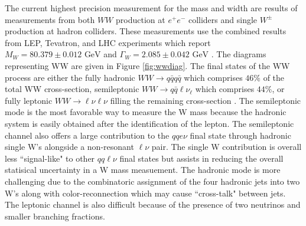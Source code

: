 


 The current highest precision measurement for the mass and width are results of measurements from both $WW$ production at $e^+ e^-$ colliders and single $W^\pm$ production at hadron colliders. These measurements use the combined results from LEP, Tevatron, and LHC experiments which report $M_W = 80.379 \pm 0.012 \, \, \text{GeV} $ and $\Gamma_W = 2.085 \pm 0.042 \,  \,\text{GeV}$ \cite{pdg}. The diagrams representing WW are given in Figure \ref{fig:wwdiag}. The final states of the WW process are either the fully hadronic $WW\rightarrow q\bar{q}q\bar{q}$ which comprises $46\%$ of the total WW cross-section, semileptonic $WW\rightarrow q\bar{q}\ell\nu_{\ell}$ which comprises $44\%$, or fully leptonic $WW\rightarrow \ell \nu \ell \nu$ filling the remaining cross-section \cite{wwOPAL}. The semileptonic mode is the most favorable way to measure the W mass because the hadronic system is easily obtained after the identification of the lepton. The semileptonic channel also offers a large contribution to the $qqe\nu$ final state through hadronic single W's alongside a non-resonant $\ell \nu$ pair. The single W contribution is overall less ``signal-like" to other $qq\ell\nu$ final states but assists in reducing the overall statisical uncertainty in a W mass measuement. The hadronic mode is more challenging due to the combinatoric assignment of the four hadronic jets into two W's along with color-reconnection which may cause ``cross-talk" between jets. The leptonic channel is also difficult because of the presence of two neutrinos and smaller branching fractions.

